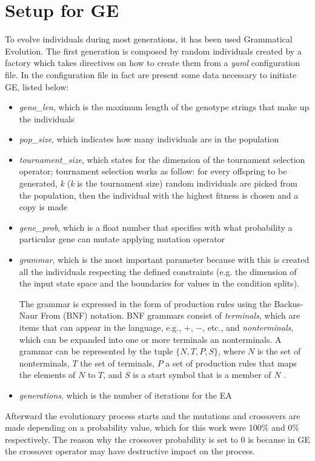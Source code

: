 \section{Setup for GE}
\label{sec:210}
To evolve individuals during most generations, it has been used Grammatical Evolution. The first generation is composed by random individuals created by a factory which takes directives on how to create them from a \textit{yaml} configuration file. In the configuration file in fact are present some data necessary to initiate GE, listed below:
\begin{itemize}
    \item \textit{geno\_len}, which is the maximum length of the genotype strings that make up the individuals
    \item \textit{pop\_size}, which indicates how many individuals are in the population
    \item \textit{tournament\_size}, which states for the dimension of the tournament selection operator; tournament selection works as follow: for every offspring to be generated, \textit{k} (\textit{k} is the tournament size) random individuals are picked from the population, then the individual with the highest fitness is chosen and a copy is made
    \item \textit{gene\_prob}, which is a float number that specifies with what probability a particular gene can mutate applying mutation operator
    \item \textit{grammar}, which is the most important parameter because with this is created all the individuals respecting the defined constraints (e.g. the dimension of the input state space and the boundaries for values in the condition splits).
    
    The grammar is expressed in the form of production rules using the Backus-Naur From (BNF) notation. BNF grammars consist of \textit{terminals}, which are items that can appear in the language, e.g., $+$, $-$, etc., and \textit{nonterminals}, which can be expanded into one or more terminals an nonterminals. A grammar can be represented by the tuple $\{N,T,P,S\}$, where $N$ is the set of nonterminals, $T$ the set of terminals, $P$ a set of production rules that maps the elements of $N$ to $T$, and $S$ is a start symbol that is a member of $N$ \cite{neill}.
    \item \textit{generations}, which is the number of iterations for the EA
\end{itemize}
Afterward the evolutionary process starts and the mutations and crossovers are made depending on a probability value, which for this work were 100\(\%\) and 0\(\%\) respectively. The reason why the crossover probability is set to 0 is because in GE the crossover operator may have destructive impact on the process.

